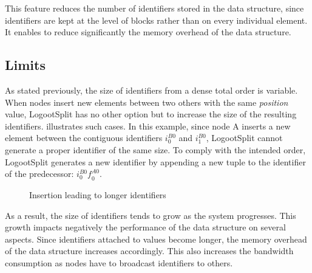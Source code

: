 \documentclass[10pt,journal,compsoc]{IEEEtran}
\let\MYoriglatexcaption\caption
\renewcommand{\caption}[2][\relax]{\MYoriglatexcaption[#2]{#2}}
\newcommand{\trm}[1]{\mathit{#1}}
\newcommand{\id}[3]{$\trm{#1}^{\trm{#2}}_{\trm{#3}}$}
\newcommand{\widthletter}{2em}
\begin{document}
This feature reduces the number of identifiers stored in the data structure, since identifiers are kept at the level of blocks rather than on every individual element.
It enables to reduce significantly the memory overhead of the data structure.

\subsection{Limits}

As stated previously, the size of identifiers from a dense total order is variable.
When nodes insert new elements between two others with the same \emph{position} value, LogootSplit has no other option but to increase the size of the resulting identifiers.
 illustrates such cases.
In this example, since node A inserts a new element between the contiguous identifiers \id{i}{B0}{0} and \id{i}{B0}{1}, LogootSplit cannot generate a proper identifier of the same size.
To comply with the intended order, LogootSplit generates a new identifier by appending a new tuple to the identifier of the predecessor: \id{i}{B0}{0}\id{f}{A0}{0}.

\begin{figure}[!ht]
    \centering
    \caption{Insertion leading to longer identifiers}
    \label{fig:example-split}
\end{figure}

As a result, the size of identifiers tends to grow as the system progresses.
This growth impacts negatively the performance of the data structure on several aspects.
Since identifiers attached to values become longer, the memory overhead of the data structure increases accordingly.
This also increases the bandwidth consumption as nodes have to broadcast identifiers to others.
\end{document}
